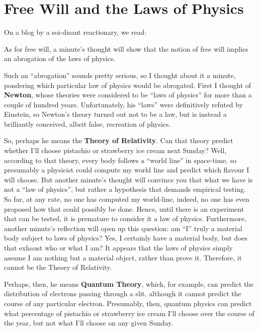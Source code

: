 \section{Free Will and the Laws of Physics}

On a blog by a soi-disant reactionary, we read:

\begin{quotex}
As for free will, a minute's thought will show that the notion of free will implies an abrogation of the laws of physics. 
\end{quotex}

Such an ``abrogation'' sounds pretty serious, so I thought about it a minute, pondering which particular law of physics would be abrogated. First I thought of \textbf{Newton}, whose theories were considered to be ``laws of physics'' for more than a couple of hundred years. Unfortunately, his ``laws'' were definitively refuted by Einstein, so Newton's theory turned out not to be a law, but is instead a brilliantly conceived, albeit false, recreation of physics.

So, perhaps he means the \textbf{Theory of Relativity}. Can that theory predict whether I'll choose pistachio or strawberry ice cream next Sunday? Well, according to that theory, every body follows a ``world line'' in space-time, so presumably a physicist could compute my world line and predict which flavour I will choose. But another minute's thought will convince you that what we have is not a ``law of physics'', but rather a hypothesis that demands empirical testing. So far, at any rate, no one has computed my world-line, indeed, no one has even proposed how that could possibly be done. Hence, until there is an experiment that can be tested, it is premature to consider it a law of physics. Furthermore, another minute's reflection will open up this question: am ``I'' truly a material body subject to laws of physics? Yes, I certainly have a material body, but does that exhaust who or what I am? It appears that the laws of physics simply assume I am nothing but a material object, rather than prove it. Therefore, it cannot be the Theory of Relativity.

Perhaps, then, he means \textbf{Quantum Theory}, which, for example, can predict the distribution of electrons passing through a slit, although it cannot predict the course of any particular electron. Presumably, then, quantum physics can predict what percentage of pistachio or strawberry ice cream I'll choose over the course of the year, but not what I'll choose on any given Sunday.

